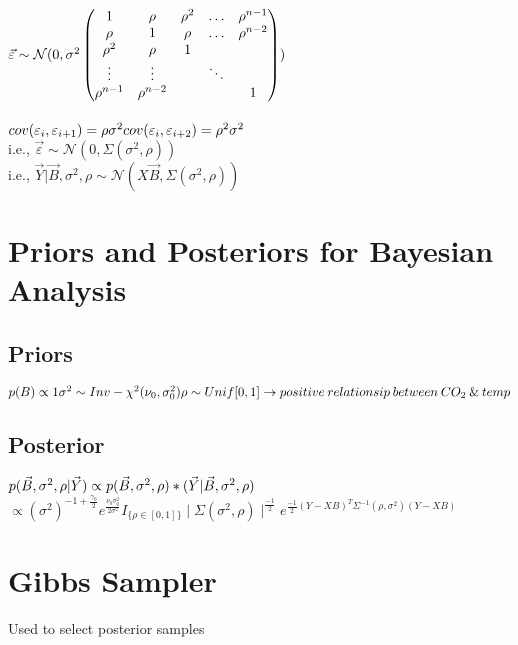 \documentclass{article}
\begin{document}
$
\vec{\varepsilon} \sim \mathcal{N}(0, \sigma^2 \left( \begin{matrix}
  1 & \rho & \rho^2  & \ldots & \rho^{n-1}\\
    \rho & 1 & \rho & \ldots & \rho^{n-2}\\
    \rho^2 & \rho & 1 \\
  \vdots & \vdots & & \ddots \\
  \rho^{n-1} & \rho^{n-2} & & & 1\\
\end{matrix} \right)) \\
$ \\ \\
$ cov(\varepsilon_{i}, \varepsilon_{i+1}) = \rho\sigma^{2} \\
cov(\varepsilon_{i}, \varepsilon_{i+2}) = \rho^{2}\sigma^{2} \\
$\\
i.e., $\vec{\varepsilon} \sim \mathcal{N}(0, \Sigma(\sigma^{2}, \rho))$ \\
i.e., $\vec{Y} | \vec{B}, \sigma^{2}, \rho \sim \mathcal{N}(X\vec{B}, 
\Sigma(\sigma^{2}, \rho))$

\section{Priors and Posteriors for Bayesian Analysis}
\subsection{Priors}
$ p(B) \propto 1 \\
\sigma^{2} \sim Inv-\chi^{2}(\nu_{0}, \sigma_{0}^{2}) \\
\rho \sim Unif[0, 1] \rightarrow positive\:relationsip\:between\:CO_{2}\:\&\:temp
$
\subsection{Posterior}
$p(\vec{B}, \sigma^{2}, \rho | \vec{Y}) \propto p(\vec{B}, \sigma^{2}, \rho)  
* (\vec{Y} | \vec{B}, \sigma^{2}, \rho) \\ $
$ \propto (\sigma^{2})^{-1 + \frac{\gamma_{0}}{2}} 
e^{\frac{\nu_{0}\sigma_{0}^{2}}{2\sigma^{2}}}
I_{\{\rho \in [0,1]\}} \mid\Sigma(\sigma^{2}, \rho)\mid^{\frac{-1}{2}}
    e^{\frac{-1}{2}(Y - XB)^{T}\Sigma^{-1}(\rho, \sigma^{2})(Y - XB)} $ 

\section{Gibbs Sampler}
Used to select posterior samples
\end{document}
